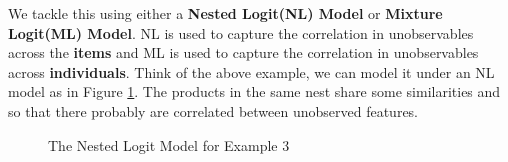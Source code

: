 \documentclass[11pt]{article}
\begin{document}
We tackle this using either a \textbf{Nested Logit(NL) Model} or \textbf{Mixture Logit(ML) Model}. NL is used to capture the correlation in unobservables across the \textbf{items} and ML is used to capture the correlation in unobservables across \textbf{individuals}. Think of the above example, we can model it under an NL model as in Figure \ref{fig:1}. The products in the same nest share some similarities and so that there probably are correlated between unobserved features.
\begin{figure}[!ht]
\begin{center}
\end{center}
\caption{The Nested Logit Model for Example 3}\label{fig:1}
\end{figure}
\end{document}
